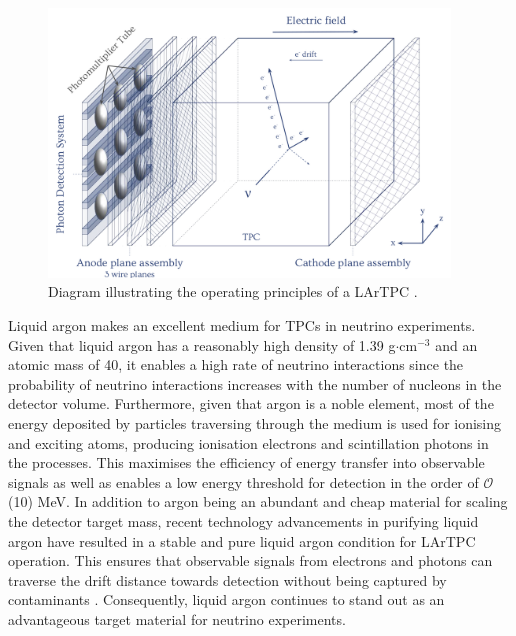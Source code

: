 \begin{figure}[ht!] 
\centering    
\includegraphics[width=0.95\textwidth]{LARTPC}
\caption[Liquid Argon Time Projection Chamber Diagram]{
Diagram illustrating the operating principles of a LArTPC \cite{RhiannonPhD}.
}
\label{fig:LARTPC}
\end{figure}

\newpage
Liquid argon makes an excellent medium for TPCs in neutrino experiments.
Given that liquid argon has a reasonably high density of 1.39 g$\cdot$cm$^{-3}$ and an atomic mass of 40, it enables a high rate of neutrino interactions since the probability of neutrino interactions increases with the number of nucleons in the detector volume.
Furthermore, given that argon is a noble element, most of the energy deposited by particles traversing through the medium is used for ionising and exciting atoms, producing ionisation electrons and scintillation photons in the processes.
This maximises the efficiency of energy transfer into observable signals as well as enables a low energy threshold for detection in the order of $\mathcal{O}$(10) MeV.
In addition to argon being an abundant and cheap material for scaling the detector target mass, recent technology advancements in purifying liquid argon have resulted in a stable and pure liquid argon condition for LArTPC operation.
This ensures that observable signals from electrons and photons can traverse the drift distance towards detection without being captured by contaminants \cite{ubooneEtime}.
Consequently, liquid argon continues to stand out as an advantageous target material for neutrino experiments. 


